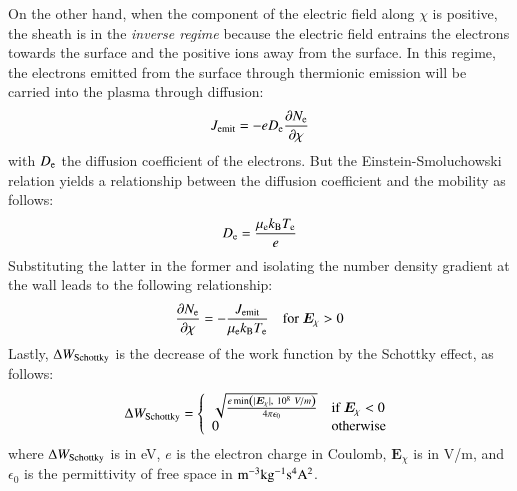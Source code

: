 \documentclass{warpdoc}
\renewcommand{\vec}[1]{\bm{#1}}
\begin{document}
On the other hand, when the component of the electric field along $\chi$ is positive, the sheath is in the \emph{inverse regime} because the electric field entrains the electrons towards the surface and the positive ions away from the surface. In this regime, the electrons emitted from the surface through thermionic emission will be carried into the plasma through diffusion:
%
\begin{equation}
 J_{\rm emit}= - e D_{\rm e} \frac{\partial N_{\rm e}}{\partial \chi}
\end{equation}
%
with $D_{\rm e}$ the diffusion coefficient of the electrons.
But the Einstein-Smoluchowski relation yields a relationship between the diffusion coefficient and the mobility as follows: 
%
\begin{equation}
  D_{\rm e}=\frac{\mu_{\rm e} k_{\rm B} T_{\rm e}}{e}
\end{equation}
%
Substituting the latter in the former and isolating the number density gradient at the wall leads to the following relationship:
%
\begin{equation}
 \frac{\partial N_{\rm e}}{\partial \chi} = -\frac{J_{\rm emit}}{\mu_{\rm e} k_{\rm B} T_{\rm e}}~~~~{\rm for~}\vec{E}_\chi>0
\end{equation}
%
Lastly, $\Delta W_{\rm Schottky}$ is the decrease of the work function by the Schottky effect, as follows:
%
\begin{equation}
 \Delta W_{\rm Schottky} = 
 \left\{ \begin{array}{ll}
 \sqrt{\frac{e \min\left(|\vec{E}_\chi|,~10^8~V/m\right)}{4 \pi \epsilon_0}}  & \textrm{if}~\vec{E}_\chi<0 \\
 0 & \textrm{otherwise} \\
 \end{array}  \right.
\end{equation}
%
where $\Delta W_{\rm Schottky}$ is in eV, $e$ is the electron charge in Coulomb, $\vec{E}_\chi$ is in V/m, and $\epsilon_0$ is the permittivity of free space in $\rm m^{-3} kg^{-1} s^4 A^2$. 

  
  
\end{document}
